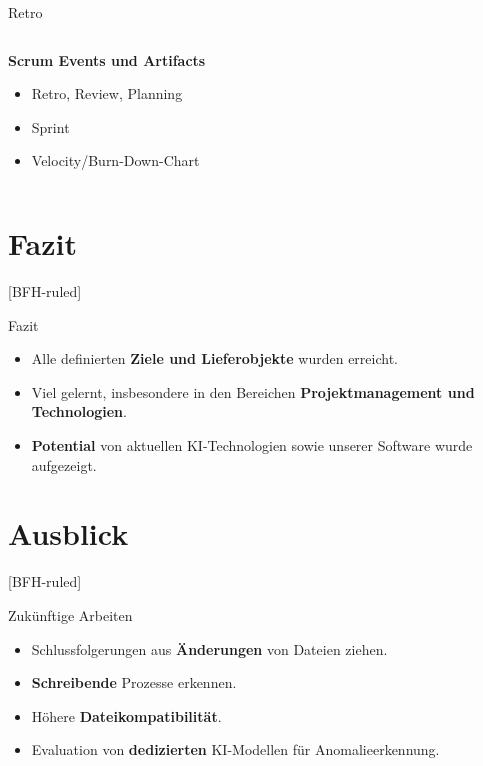 \documentclass[
    ngerman,%
    authorontitle=true,
]{bfhbeamer}
\begin{document}
\begin{frame}{Retro}
\begin{center}
\begin{columns}
\begin{column}{0.4\textwidth}
                    \textbf{Scrum Events und Artifacts}
                    \begin{itemize}
                        \item Retro, Review, Planning
                        \item Sprint
                        \item Velocity/Burn-Down-Chart
                    \end{itemize}
                \end{column}

            \end{columns}
        \end{center}
    \end{frame}


    \section{Fazit}\label{sec:fazit}
    [BFH-ruled]
    \frame{\sectionpage}

    \begin{frame}{Fazit}
        \begin{itemize}
            \item Alle definierten \textbf{Ziele und Lieferobjekte} wurden erreicht.
            \item Viel gelernt, insbesondere in den Bereichen \textbf{Projektmanagement und Technologien}.
            \item \textbf{Potential} von aktuellen KI-Technologien sowie unserer Software wurde aufgezeigt.
        \end{itemize}
    \end{frame}


    \section{Ausblick}\label{sec:ausblick}
    [BFH-ruled]
    \frame{\sectionpage}

    \begin{frame}{Zukünftige Arbeiten}
        \begin{itemize}
            \item Schlussfolgerungen aus \textbf{Änderungen} von Dateien ziehen.
            \item \textbf{Schreibende} Prozesse erkennen.
            \item Höhere \textbf{Dateikompatibilität}.
            \item Evaluation von \textbf{dedizierten} KI-Modellen für Anomalieerkennung.
        \end{itemize}
    \end{frame}
\end{document}
